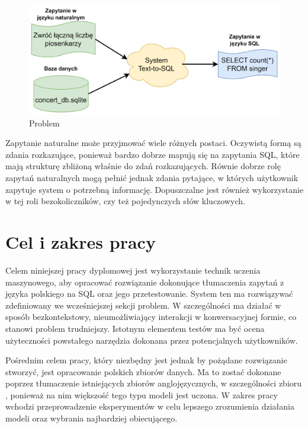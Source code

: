 \begin{figure}[ht!]
  \centering
  \includegraphics[width=0.8\linewidth]{images/text_to_sql.png}
  \caption{Problem }
  \label{fig:text-to-sql}
\end{figure}

Zapytanie naturalne może przyjmować wiele różnych postaci. Oczywistą formą są zdania rozkazujące, ponieważ bardzo dobrze mapują się na zapytania SQL, które mają strukturę zbliżoną właśnie do zdań rozkazujących. Równie dobrze rolę zapytań naturalnych mogą pełnić jednak zdania pytające, w których użytkownik zapytuje system o potrzebną informację. Dopuszczalne jest również wykorzystanie w tej roli bezokoliczników, czy też pojedynczych słów kluczowych.

\section{Cel i zakres pracy}
Celem niniejszej pracy dyplomowej jest wykorzystanie technik uczenia maszynowego, aby opracować rozwiązanie dokonujące tłumaczenia zapytań z języka polskiego na SQL oraz jego przetestowanie. System ten ma rozwiązywać zdefiniowany we wcześniejszej sekcji problem. W szczególności ma działać w sposób bezkontekstowy, nieumożliwiający interakcji w konwersacyjnej formie, co stanowi problem trudniejszy. Istotnym elementem testów ma być ocena użyteczności powstałego narzędzia dokonana przez potencjalnych użytkowników.

Pośrednim celem pracy, który niezbędny jest jednak by pożądane rozwiązanie stworzyć, jest opracowanie polskich zbiorów danych. Ma to zostać dokonane poprzez tłumaczenie istniejących zbiorów anglojęzycznych, w szczególności zbioru , ponieważ na nim większość tego typu modeli jest uczona. W zakres pracy wchodzi przeprowadzenie eksperymentów w celu lepszego zrozumienia działania modeli  oraz wybrania najbardziej obiecującego.

